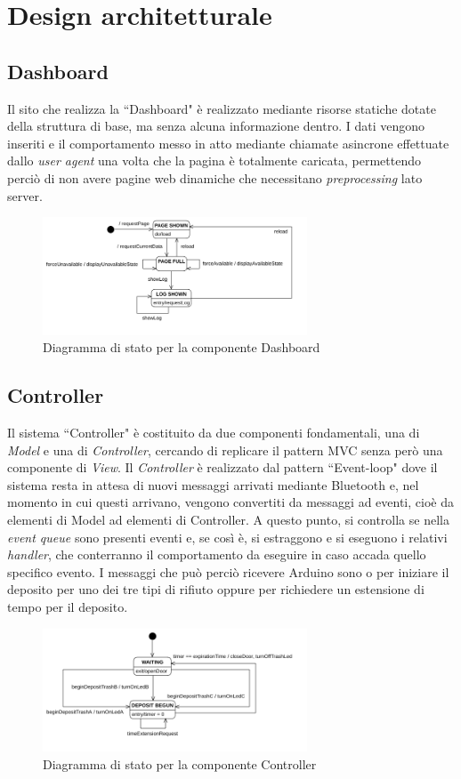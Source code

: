 \documentclass[a4paper, 12pt]{report}
\begin{document}
		\section{Design architetturale}
			\subsection{Dashboard}
			Il sito che realizza la ``Dashboard" è realizzato mediante risorse statiche dotate
			della struttura di base, ma senza alcuna informazione dentro. I dati vengono inseriti e il
			comportamento messo in atto mediante chiamate asincrone effettuate dallo \textit{user agent}
			una volta che la pagina è totalmente caricata, permettendo perciò di non avere pagine web
			dinamiche che necessitano \textit{preprocessing} lato server.
			\begin{figure}[H]
				\centering
				\includegraphics[width=0.7\textwidth]{"img/DashboardStatechart.png"}    
				\caption{Diagramma di stato per la componente Dashboard}
			\end{figure}
			\subsection{Controller}
			Il sistema ``Controller" è costituito da due componenti fondamentali, una di \textit{Model}
			e una di \textit{Controller}, cercando di replicare il pattern MVC senza però una componente
			di \textit{View}. Il \textit{Controller} è realizzato dal pattern ``Event-loop" dove il
			sistema resta in attesa di nuovi messaggi arrivati mediante Bluetooth e, nel momento in cui
			questi arrivano, vengono convertiti da messaggi ad eventi, cioè da elementi di Model ad
			elementi di Controller. A questo punto, si controlla se nella \textit{event queue} sono
			presenti eventi e, se così è, si estraggono e si eseguono i relativi \textit{handler}, che
			conterranno il comportamento da eseguire in caso accada quello specifico evento. I
			messaggi che può perciò ricevere Arduino sono o per iniziare il deposito per uno dei tre
			tipi di rifiuto oppure per richiedere un estensione di tempo per il deposito.
			\begin{figure}[H]
				\centering
				\includegraphics[width=0.7\textwidth]{"img/ControllerStatechart.png"}    
				\caption{Diagramma di stato per la componente Controller}
			\end{figure}
\end{document}

